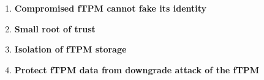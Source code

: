 \begin{enumerate}

  \item{\textbf{Compromised fTPM cannot fake its identity}}
  \item{\textbf{Small root of trust}}
  

  \item{\textbf{Isolation of fTPM storage}}
  
  \item{\textbf{Protect fTPM data from downgrade attack of the fTPM}}
  





\end{enumerate}
